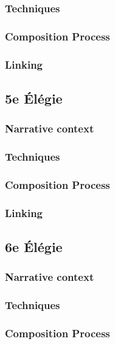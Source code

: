 \documentclass[12pt,twoside,maitrise]{dms}
\theoremstyle{definition}
\numberwithin{equation}{section}
\numberwithin{table}{chapter}
\numberwithin{figure}{chapter}
\begin{document}
\subsubsection{Techniques}

\subsubsection{Composition Process}

\subsubsection{Linking}

\subsection{5e Élégie}

\subsubsection{Narrative context}

\subsubsection{Techniques}

\subsubsection{Composition Process}

\subsubsection{Linking}

\subsection{6e Élégie}

\subsubsection{Narrative context}

\subsubsection{Techniques}

\subsubsection{Composition Process}
\end{document}
